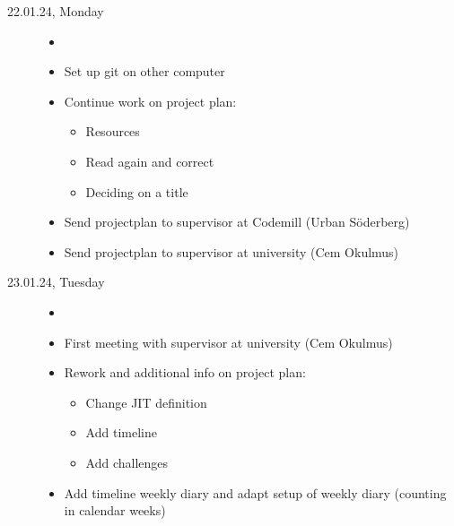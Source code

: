 \documentclass[a4, 11pt]{scrartcl}
\begin{document}
\begin{description}


\item[22.01.24, Monday]
\begin{itemize}
	\item[]
	\item Set up git on other computer
		\item Continue work on project plan:
	\begin{itemize}
		\item Resources
		\item Read again and correct
		\item Deciding on a title
	\end{itemize}
	\item Send projectplan to supervisor at Codemill (Urban Söderberg)
	\item Send projectplan to supervisor at university (Cem Okulmus)
\end{itemize}







\item[23.01.24, Tuesday]
\begin{itemize}
	\item[]
	\item First meeting with supervisor at university (Cem Okulmus)
	\item Rework and additional info on project plan:
	\begin{itemize}
		\item Change JIT definition
		\item Add timeline
		\item Add challenges
	\end{itemize}
	\item Add timeline weekly diary and adapt setup of weekly diary (counting in calendar weeks)
\end{itemize}









		
		
	\end{description}
	
	
	
	
	
	
\end{document}
